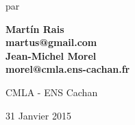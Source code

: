 \begin{center}
    \Large
    par
\end{center}


\begin{center}
    \Large\bfseries
    Mart\'{i}n Rais\\
    \normalsize
    martus@gmail.com\\
      \Large\bfseries
    Jean-Michel Morel\\
    \normalsize
    morel@cmla.ens-cachan.fr
\end{center}
\vspace{1cm}

\vspace{1cm}
\begin{center}
    \huge
    CMLA - ENS Cachan\\
\end{center}

\begin{center}
\large
   31 Janvier 2015
\end{center}

\thispagestyle{empty}




